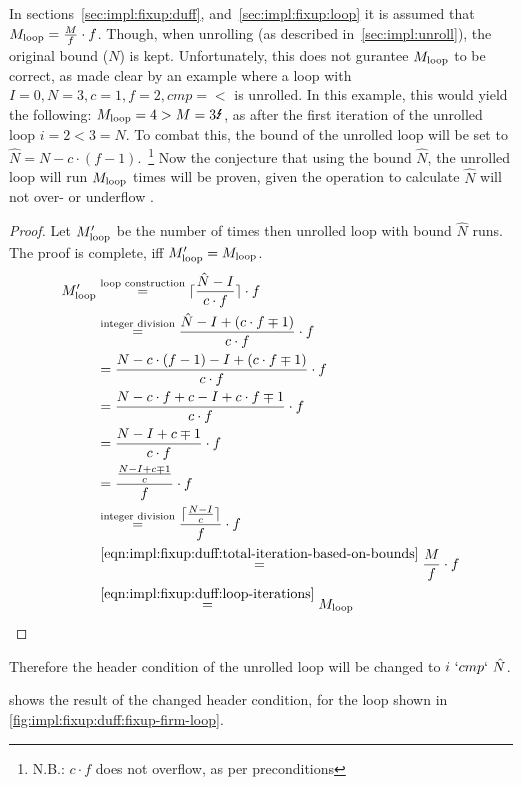 In sections~\ref{sec:impl:fixup:duff}, and~\ref{sec:impl:fixup:loop} it is assumed that $M_{\text{loop}} = \frac{M}{f} \cdot f$.
Though, when unrolling (as described in~\cref{sec:impl:unroll}), the original bound ($N$) is kept.
Unfortunately, this does not gurantee $M_{\text{loop}}$ to be correct, as made clear by an example where a loop with $I = 0, N = 3, c = 1, f = 2, cmp = <$ is unrolled.
In this example, this would yield the following: $\Mloop = 4 > M = 3 \mLightning$, as after the first iteration of the unrolled loop $i = 2 < 3 = N$.
To combat this, the bound of the unrolled loop will be set to $\hat{N} = N - c \cdot (f - 1)$.~\footnote{N.B.: $c \cdot f$ does not overflow, as per preconditions}
Now the conjecture that using the bound $\hat{N}$, the unrolled loop will run $M_{\text{loop}}$ times will be proven, given the operation to calculate $\hat{N}$ will not over- or underflow .
\begin{proof}
    Let $M_{\text{loop}}'$ be the number of times then unrolled loop with bound $\hat{N}$ runs.
    The proof is complete, iff $M_{\text{loop}}' = M_{\text{loop}}$.
    \begin{align*}
        M_{\text{loop}}' &\overset{\text{loop construction}}{=} \lceil{}\frac{\hat{N} - I}{c \cdot f}\rceil{} \cdot f\\
        &\overset{\text{integer division}}{=} \frac{\hat{N} - I + (c \cdot f \mp 1)}{c \cdot f} \cdot f\\
        &= \frac{N - c \cdot (f - 1) - I + (c \cdot f \mp 1)}{c \cdot f} \cdot f\\
        &= \frac{N - c \cdot f + c - I + c \cdot f \mp 1}{c \cdot f} \cdot f\\
        &= \frac{N - I + c \mp 1}{c \cdot f} \cdot f\\
        &= \frac{\frac{N - I + c \mp 1}{c}}{f} \cdot f\\
        &\overset{\text{integer division}}{=} \frac{\lceil{}\frac{N - I}{c}\rceil{}}{f} \cdot f\\
        &\overset{\ref{eqn:impl:fixup:duff:total-iteration-based-on-bounds}}{=} \frac{M}{f} \cdot f\\
        &\overset{\ref{eqn:impl:fixup:duff:loop-iterations}}{=} M_{\text{loop}}
    \end{align*}
\end{proof}

Therefore the header condition of the unrolled loop will be changed to $i~`cmp`~\hat{N}$.

 shows the result of the changed header condition, for the loop shown in \cref{fig:impl:fixup:duff:fixup-firm-loop}.

